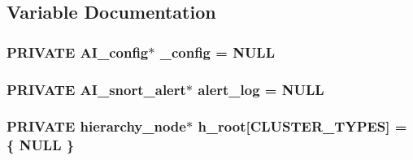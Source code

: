 \subsection{Variable Documentation}
\hypertarget{group__cluster_ga91458e2d34595688e39fcb63ba418849}{
\subsubsection[{\_\-config}]{\setlength{\rightskip}{0pt plus 5cm}PRIVATE {\bf AI\_\-config}$\ast$ {\bf \_\-config} = NULL}}
\label{group__cluster_ga91458e2d34595688e39fcb63ba418849}
\hypertarget{group__cluster_gaaf4c19f60f48741b0890c6114dcff7d9}{
\subsubsection[{alert\_\-log}]{\setlength{\rightskip}{0pt plus 5cm}PRIVATE {\bf AI\_\-snort\_\-alert}$\ast$ {\bf alert\_\-log} = NULL}}
\label{group__cluster_gaaf4c19f60f48741b0890c6114dcff7d9}
\hypertarget{group__cluster_ga97d35425cf5a0207fb50b64ee8cdda82}{
\subsubsection[{h\_\-root}]{\setlength{\rightskip}{0pt plus 5cm}PRIVATE {\bf hierarchy\_\-node}$\ast$ {\bf h\_\-root}\mbox{[}CLUSTER\_\-TYPES\mbox{]} = \{ NULL \}}}
\label{group__cluster_ga97d35425cf5a0207fb50b64ee8cdda82}

